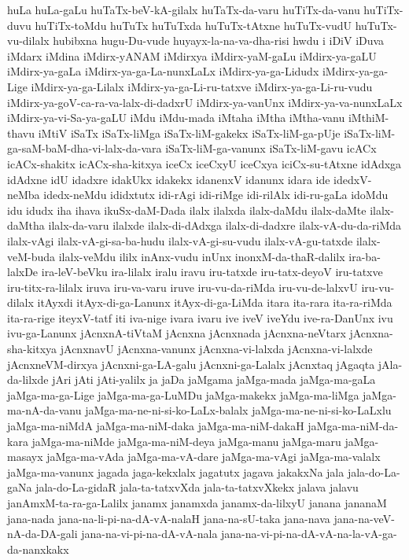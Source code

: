 {huLa
huLa-gaLu
huTaTx-beV-kA-gilalx
huTaTx-da-varu
huTiTx-da-vanu
huTiTx-duvu
huTiTx-toMdu
huTuTx
huTuTxda
huTuTx-tAtxne
huTuTx-vudU
huTuTx-vu-dilalx
hubibxna
hugu-Du-vude
huyayx-la-na-va-dha-risi
hwdu
i
iDiV
iDuva
iMdarx
iMdina
iMdirx-yANAM
iMdirxya
iMdirx-yaM-gaLu
iMdirx-ya-gaLU
iMdirx-ya-gaLa
iMdirx-ya-ga-La-nunxLaLx
iMdirx-ya-ga-Lidudx
iMdirx-ya-ga-Lige
iMdirx-ya-ga-Lilalx
iMdirx-ya-ga-Li-ru-tatxve
iMdirx-ya-ga-Li-ru-vudu
iMdirx-ya-goV-ca-ra-va-lalx-di-dadxrU
iMdirx-ya-vanUnx
iMdirx-ya-va-nunxLaLx
iMdirx-ya-vi-Sa-ya-gaLU
iMdu
iMdu-mada
iMtaha
iMtha
iMtha-vanu
iMthiM-thavu
iMtiV
iSaTx
iSaTx-liMga
iSaTx-liM-gakekx
iSaTx-liM-ga-pUje
iSaTx-liM-ga-saM-baM-dha-vi-lalx-da-vara
iSaTx-liM-ga-vanunx
iSaTx-liM-gavu
icACx
icACx-shakitx
icACx-sha-kitxya
iceCx
iceCxyU
iceCxya
iciCx-su-tAtxne
idAdxga
idAdxne
idU
idadxre
idakUkx
idakekx
idanenxV
idanunx
idara
ide
idedxV-neMba
idedx-neMdu
ididxtutx
idi-rAgi
idi-riMge
idi-rilAlx
idi-ru-gaLa
idoMdu
idu
idudx
iha
ihava
ikuSx-daM-Dada
ilalx
ilalxda
ilalx-daMdu
ilalx-daMte
ilalx-daMtha
ilalx-da-varu
ilalxde
ilalx-di-dAdxga
ilalx-di-dadxre
ilalx-vA-du-da-riMda
ilalx-vAgi
ilalx-vA-gi-sa-ba-hudu
ilalx-vA-gi-su-vudu
ilalx-vA-gu-tatxde
ilalx-veM-buda
ilalx-veMdu
ililx
inAnx-vudu
inUnx
inonxM-da-thaR-dalilx
ira-ba-lalxDe
ira-leV-beVku
ira-lilalx
iralu
iravu
iru-tatxde
iru-tatx-deyoV
iru-tatxve
iru-titx-ra-lilalx
iruva
iru-va-varu
iruve
iru-vu-da-riMda
iru-vu-de-lalxvU
iru-vu-dilalx
itAyxdi
itAyx-di-ga-Lanunx
itAyx-di-ga-LiMda
itara
ita-rara
ita-ra-riMda
ita-ra-rige
iteyxV-tatf
iti
iva-nige
ivara
ivaru
ive
iveV
iveYdu
ive-ra-DanUnx
ivu
ivu-ga-Lanunx
jAcnxnA-tiVtaM
jAcnxna
jAcnxnada
jAcnxna-neVtarx
jAcnxna-sha-kitxya
jAcnxnavU
jAcnxna-vanunx
jAcnxna-vi-lalxda
jAcnxna-vi-lalxde
jAcnxneVM-dirxya
jAcnxni-ga-LA-galu
jAcnxni-ga-Lalalx
jAcnxtaq
jAgaqta
jAla-da-lilxde
jAri
jAti
jAti-yalilx
ja
jaDa
jaMgama
jaMga-mada
jaMga-ma-gaLa
jaMga-ma-ga-Lige
jaMga-ma-ga-LuMDu
jaMga-makekx
jaMga-ma-liMga
jaMga-ma-nA-da-vanu
jaMga-ma-ne-ni-si-ko-LaLx-balalx
jaMga-ma-ne-ni-si-ko-LaLxlu
jaMga-ma-niMdA
jaMga-ma-niM-daka
jaMga-ma-niM-dakaH
jaMga-ma-niM-da-kara
jaMga-ma-niMde
jaMga-ma-niM-deya
jaMga-manu
jaMga-maru
jaMga-masayx
jaMga-ma-vAda
jaMga-ma-vA-dare
jaMga-ma-vAgi
jaMga-ma-valalx
jaMga-ma-vanunx
jagada
jaga-kekxlalx
jagatutx
jagava
jakakxNa
jala
jala-do-La-gaNa
jala-do-La-gidaR
jala-ta-tatxvXda
jala-ta-tatxvXkekx
jalava
jalavu
janAmxM-ta-ra-ga-Lalilx
janamx
janamxda
janamx-da-lilxyU
janana
jananaM
jana-nada
jana-na-li-pi-na-dA-vA-nalaH
jana-na-sU-taka
jana-nava
jana-na-veV-nA-da-DA-gali
jana-na-vi-pi-na-dA-vA-nala
jana-na-vi-pi-na-dA-vA-na-la-vA-ga-da-nanxkakx
}
